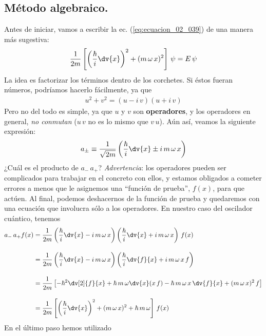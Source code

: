 \subsection{Método algebraico.}
Antes de iniciar, vamos a escribir la ec. (\ref{eq:ecuacion_02_039}) de una manera más sugestiva:
\begin{equation}
\dfrac{1}{2 m} \left[ \left( \dfrac{\hbar}{i} \dv{x} \right)^{2} + (m \, \omega \, x)^{2} \right] \, \psi = E \, \psi
\label{eq:ecuacion_02_040}
\end{equation}
La idea es factorizar los términos dentro de los corchetes. Si éstos fueran números, podríamos hacerlo fácilmente, ya que
\begin{align*}
u^{2} + v^{2} = (u - i \, v)(u + i \, v)
\end{align*}
Pero no del todo es simple, ya que $u$ y $v$ son \textbf{operadores}, y los operadores en general, \textit{no conmutan} ($u \, v$ no es lo mismo que $v \, u$). Aún así, veamos la siguiente expresión:
\begin{equation}
a_{\pm} \equiv \dfrac{1}{\sqrt{2 m }} \left( \dfrac{\hbar}{i} \dv{x} \pm i \, m \, \omega \, x \right)
\label{eq:ecuacion_02_041}
\end{equation}
¿Cuál es el producto de $a_{-} \, a_{+}$? \emph{Advertencia}: los operadores pueden ser complicados para trabajar en el concreto con ellos, y estamos obligados a cometer errores a menos que le asignemos una \enquote{función de prueba}, $f (x)$, para que actúen. Al final, podemos deshacernos de la función de prueba y quedaremos con una ecuación que involucra sólo a los operadores. En nuestro caso del oscilador cuántico, tenemos
\begin{align*}
a_{-} \, a_{+} f(x) &= \dfrac{1}{2 m} \left( \dfrac{\hbar}{i} \dv{x} - i \, m \, \omega \, x \right) \left( \dfrac{\hbar}{i} \dv{x} + i \, m \, \omega \, x \right) \, f(x) \\[1em]
&= \dfrac{1}{2 m} \left( \dfrac{\hbar}{i} \dv{x} - i \, m \, \omega \, x \right) \left( \dfrac{\hbar}{i} \dv{f}{x} + i \, m \, \omega \, x \, f \right) \\[1em]
&= \dfrac{1}{2 m}  \left[ - \hbar^{2} \dv[2]{f}{x} + \hbar \, m \, \omega \dv{x} (x \, f) - \hbar \, m \, \omega \, x \, \dv{f}{x} + (m \, \omega \, x)^{2} \, f \right] \\[1em]
&= \dfrac{1}{2 m} \left[ \left( \dfrac{\hbar}{i} \dv{x} \right)^{2} + (m \, \omega \, x)^{2} + \hbar \, m\, \omega \right] \, f(x)
\end{align*}
En el último paso hemos utilizado
